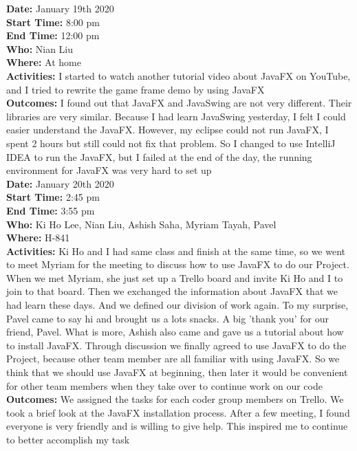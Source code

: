 \documentclass[12pt]{article}
\begin{document}
{\bf Date:} January 19th 2020\\
{\bf Start Time:} 8:00 pm\\
{\bf End Time:} 12:00 pm \\
{\bf Who:} Nian Liu \\
{\bf Where:} At home \\
{\bf Activities:} I started to watch another tutorial video about JavaFX on YouTube, and I tried to rewrite the game frame demo by using JavaFX \\ 
{\bf Outcomes:} I found out that JavaFX and JavaSwing are not very different. Their libraries are very similar. Because I had learn JavaSwing yesterday, I felt I could easier understand the JavaFX. However, my eclipse could not run JavaFX, I spent 2 hours but still could not fix that problem. So I changed to use IntelliJ IDEA to run the JavaFX, but I failed at the end of the day, the running environment for JavaFX was very hard to set up\\

{\bf Date:} January 20th 2020\\
{\bf Start Time:} 2:45 pm\\
{\bf End Time:} 3:55 pm \\
{\bf Who:} Ki Ho Lee, Nian Liu, Ashish Saha, Myriam Tayah, Pavel\\
{\bf Where:} H-841 \\
{\bf Activities:} Ki Ho and I had same class and finish at the same time, so we went to meet Myriam for the meeting to discuss how to use JavaFX to do our Project. When we met Myriam, she just set up a Trello board and invite Ki Ho and I to join to that board. Then we exchanged the information about JavaFX that we had learn these days. And we defined our division of work again. To my surprise, Pavel came to say hi and brought us a lots snacks. A big 'thank you' for our friend, Pavel. What is more, Ashish also came and gave us a tutorial about how to install JavaFX. Through discussion we finally agreed to use JavaFX to do the Project, because other team member are all familiar with using JavaFX. So we think that we should use JavaFX at beginning, then later it would be convenient for other team members when they take over to continue work on our code\\
{\bf Outcomes:} We assigned the tasks for each coder group members on Trello. We took a brief look at the JavaFX installation process. After a few meeting, I found everyone is very friendly and is willing to give help. This inspired me to continue to better accomplish my task\\


\end{document}
